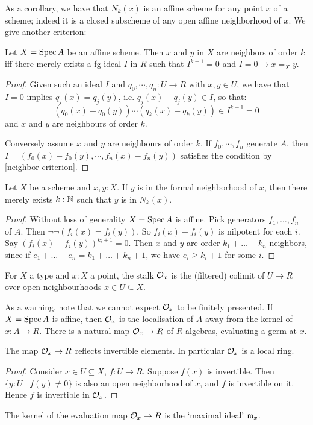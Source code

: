 As a corollary, we have that $N_k(x)$ is an affine scheme
for any point $x$ of a scheme; 
indeed it is a closed subscheme of any open affine neighborhood of $x$. We give another criterion:

\begin{lemma}\label{nbhd-criterion-ideal}
Let $X = \operatorname{Spec} A$ be an affine scheme. Then $x$ and $y$ in $X$ are neighbors of order $k$ iff 
there merely exists a fg ideal $I$ in $R$ such that $I^{k+1}=0$ and $I=0 \to x=_Xy$.
\end{lemma}
\begin{proof}
Given such an ideal $I$ and $q_0,\cdots,q_n : U\to R$ with $x,y\in U$, we have that $I=0$ implies $q_j(x) = q_j(y)$, i.e. $q_j(x)-q_j(y) \in I$, so that:
\[(q_0(x)-q_0(y))\cdots (q_k(x)-q_k(y)) \in I^{k+1} = 0\]
and $x$ and $y$ are neighbours of order $k$.

Conversely assume $x$ and $y$ are neighbours of order $k$. If $f_0,\cdots,f_n$ generate $A$, then $I = (f_0(x)-f_0(y),\cdots, f_n(x)-f_n(y))$ satisfies the condition by \cref{neighbor-criterion}.
\end{proof}

\begin{lemma}\label{formal-nbhd-union}
Let $X$ be a scheme and $x, y : X$. If $y$ is in the formal neighborhood of $x$,
then there merely exists $k : \mathbb{N}$ such that $y$ is in $N_k(x)$.
\end{lemma}
\begin{proof}
Without loss of generality $X = \operatorname{Spec} A$ is affine. Pick generators
$f_1,\ldots,f_n$ of $A$. Then $\neg \neg(f_i(x)=f_i(y))$.
So $f_i(x)-f_i(y)$ is nilpotent for each $i$.
Say $(f_i(x)-f_i(y))^{k_i+1} = 0$.
Then $x$ and $y$ are order $k_1+\ldots+k_n$ neighbors, since
if $e_1+\ldots+e_n = k_1+\ldots+k_n+1$, we have
$e_i \ge k_i+1$ for some $i$.
\end{proof}

\begin{definition}
For $X$ a type and $x : X$ a point, the stalk $\mathcal{O}_x$ is the (filtered) 
colimit of $U \to R$ over open neighbourhoods $x \in U \subseteq X$.
\end{definition}

As a warning, note that we cannot expect $\mathcal{O}_x$ to be finitely presented.
If $X = \operatorname{Spec} A$ is affine, then $\mathcal{O}_x$ is the localisation of $A$ away from the kernel
of $x : A \to R$.
There is a natural map $\mathcal{O}_x \to R$ of $R$-algebras, evaluating a germ at $x$.

\begin{lemma}
The map $\mathcal{O}_x \to R$ reflects invertible elements. In particular $\mathcal{O}_x$ is a local ring.
\end{lemma}
\begin{proof}
Consider $x \in U \subseteq X$, $f : U \to R$. Suppose $f(x)$ is invertible.
Then $\{y : U \mid f(y) \ne 0 \}$ is also an open neighborhood of $x$,
and $f$ is invertible on it. Hence $f$ is invertible in $\mathcal{O}_x$.
\end{proof}
\begin{definition}
The kernel of the evaluation map $\mathcal{O}_x \to R$ is the `maximal ideal' $\mathfrak{m}_x$.
\end{definition}

